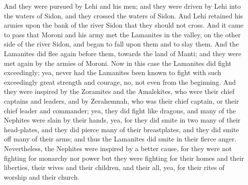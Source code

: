 And they were pursued by Lehi and his men; and they were driven by Lehi into the waters of Sidon, and they crossed the waters of Sidon. And Lehi retained his armies upon the bank of the river Sidon that they should not cross.
\bverse \iffalse And it came to pass that Moroni and his army met the Lamanites in the valley, on the other side of the river Sidon, and began to fall upon them and to slay them. \fi
And it came to pass that Moroni and his army met the Lamanites in the valley, on the other side of the river Sidon, and began to fall upon them and to slay them.
\bverse \iffalse And the Lamanites did flee again before them, towards the land of Manti; and they were met again by the armies of Moroni. \fi
And the Lamanites did flee again before them, towards the land of Manti; and they were met again by the armies of Moroni.
\bverse \iffalse Now in this case the Lamanites did fight exceedingly; yea, never had the Lamanites been known to fight with such exceedingly great strength and courage, no, not even from the beginning. \fi
Now in this case the Lamanites did fight exceedingly; yea, never had the Lamanites been known to fight with such exceedingly great strength and courage, no, not even from the beginning.
\bverse \iffalse And they were inspired by the Zoramites and the Amalekites, who were their chief captains and leaders, and by Zerahemnah, who was their chief captain, or their chief leader and commander; yea, they did fight like dragons, and many of the Nephites were slain by their hands, yea, for they did smite in two many of their head-plates, and they did pierce many of their breastplates, and they did smite off many of their arms; and thus the Lamanites did smite in their fierce anger. \fi
And they were inspired by the Zoramites and the Amalekites, who were their chief captains and leaders, and by Zerahemnah, who was their chief captain, or their chief leader and commander; yea, they did fight like dragons, and many of the Nephites were slain by their hands, yea, for they did smite in two many of their head-plates, and they did pierce many of their breastplates, and they did smite off many of their arms; and thus the Lamanites did smite in their fierce anger.
\bverse \iffalse Nevertheless, the Nephites were inspired by a better cause, for they were not fighting for monarchy nor power but they were fighting for their homes and their liberties, their wives and their children, and their all, yea, for their rites of worship and their church. \fi
Nevertheless, the Nephites were inspired by a better cause, for they were not fighting for monarchy nor power but they were fighting for their homes and their liberties, their wives and their children, and their all, yea, for their rites of worship and their church.
